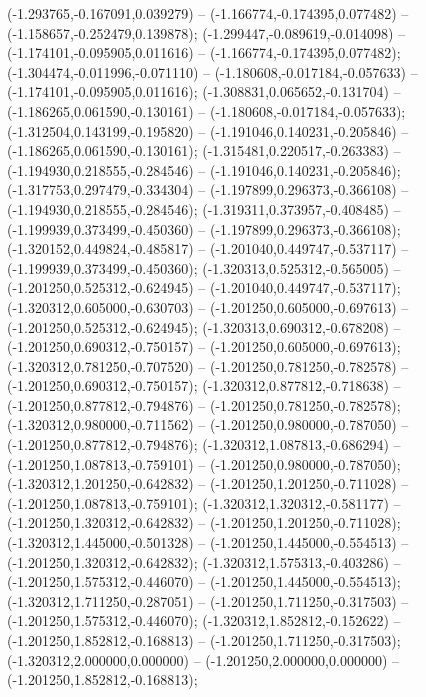  (-1.293765,-0.167091,0.039279) -- (-1.166774,-0.174395,0.077482) -- (-1.158657,-0.252479,0.139878);
 (-1.299447,-0.089619,-0.014098) -- (-1.174101,-0.095905,0.011616) -- (-1.166774,-0.174395,0.077482);
 (-1.304474,-0.011996,-0.071110) -- (-1.180608,-0.017184,-0.057633) -- (-1.174101,-0.095905,0.011616);
 (-1.308831,0.065652,-0.131704) -- (-1.186265,0.061590,-0.130161) -- (-1.180608,-0.017184,-0.057633);
 (-1.312504,0.143199,-0.195820) -- (-1.191046,0.140231,-0.205846) -- (-1.186265,0.061590,-0.130161);
 (-1.315481,0.220517,-0.263383) -- (-1.194930,0.218555,-0.284546) -- (-1.191046,0.140231,-0.205846);
 (-1.317753,0.297479,-0.334304) -- (-1.197899,0.296373,-0.366108) -- (-1.194930,0.218555,-0.284546);
 (-1.319311,0.373957,-0.408485) -- (-1.199939,0.373499,-0.450360) -- (-1.197899,0.296373,-0.366108);
 (-1.320152,0.449824,-0.485817) -- (-1.201040,0.449747,-0.537117) -- (-1.199939,0.373499,-0.450360);
 (-1.320313,0.525312,-0.565005) -- (-1.201250,0.525312,-0.624945) -- (-1.201040,0.449747,-0.537117);
 (-1.320312,0.605000,-0.630703) -- (-1.201250,0.605000,-0.697613) -- (-1.201250,0.525312,-0.624945);
 (-1.320313,0.690312,-0.678208) -- (-1.201250,0.690312,-0.750157) -- (-1.201250,0.605000,-0.697613);
 (-1.320312,0.781250,-0.707520) -- (-1.201250,0.781250,-0.782578) -- (-1.201250,0.690312,-0.750157);
 (-1.320312,0.877812,-0.718638) -- (-1.201250,0.877812,-0.794876) -- (-1.201250,0.781250,-0.782578);
 (-1.320312,0.980000,-0.711562) -- (-1.201250,0.980000,-0.787050) -- (-1.201250,0.877812,-0.794876);
 (-1.320312,1.087813,-0.686294) -- (-1.201250,1.087813,-0.759101) -- (-1.201250,0.980000,-0.787050);
 (-1.320312,1.201250,-0.642832) -- (-1.201250,1.201250,-0.711028) -- (-1.201250,1.087813,-0.759101);
 (-1.320312,1.320312,-0.581177) -- (-1.201250,1.320312,-0.642832) -- (-1.201250,1.201250,-0.711028);
 (-1.320312,1.445000,-0.501328) -- (-1.201250,1.445000,-0.554513) -- (-1.201250,1.320312,-0.642832);
 (-1.320312,1.575313,-0.403286) -- (-1.201250,1.575312,-0.446070) -- (-1.201250,1.445000,-0.554513);
 (-1.320312,1.711250,-0.287051) -- (-1.201250,1.711250,-0.317503) -- (-1.201250,1.575312,-0.446070);
 (-1.320312,1.852812,-0.152622) -- (-1.201250,1.852812,-0.168813) -- (-1.201250,1.711250,-0.317503);
 (-1.320312,2.000000,0.000000) -- (-1.201250,2.000000,0.000000) -- (-1.201250,1.852812,-0.168813);
